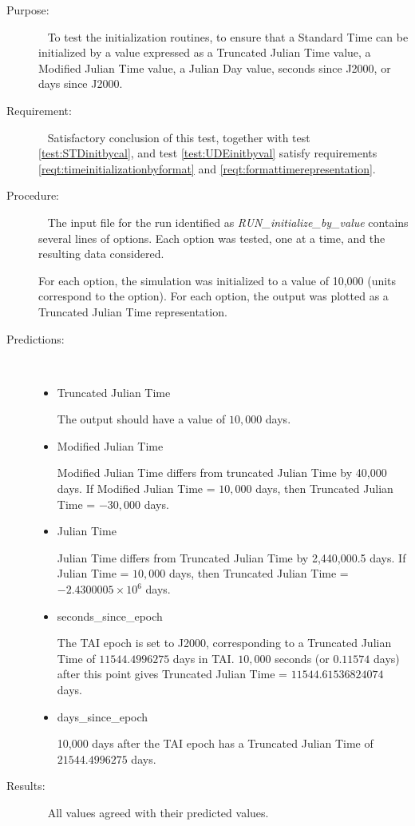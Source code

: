 \label{test:STDinitbyval}
\begin{description}
\item[Purpose:]\ \newline
To test the initialization routines, to ensure that a Standard Time can be initialized by a value expressed as a Truncated Julian Time value, a Modified Julian Time value, a Julian Day value, seconds since J2000, or days since J2000.

\item[Requirement:]\ \newline
Satisfactory conclusion of this test, together with test \ref{test:STDinitbycal}, and test \ref{test:UDEinitbyval} satisfy requirements \ref{reqt:timeinitializationbyformat} and \ref{reqt:formattimerepresentation}.

\item[Procedure:]\ \newline
The input file for the run identified as \textit{RUN\_initialize\_by\_value} contains several lines of options.  Each option was tested, one at a time, and the resulting data considered.

For each option, the simulation was initialized to a value of 10,000 (units correspond to the option).  For each option, the output was plotted as a Truncated Julian Time representation.

\item[Predictions:]\ \newline
\begin{itemize}
	\item {Truncated Julian Time}

	The output should have a value of $10,000$ days.
	\item {Modified Julian Time}

	Modified Julian Time differs from truncated Julian Time by 40,000 days.  If Modified Julian Time = $10,000$ days, then Truncated Julian Time = $-30,000$ days.
	\item {Julian Time}

	Julian Time differs from Truncated Julian Time by 2,440,000.5 days.  If Julian Time = $10,000$ days, then Truncated Julian Time = $-2.4300005 \times 10^6 $ days.
	\item {seconds\_since\_epoch}

	The TAI epoch is set to J2000, corresponding to a Truncated Julian Time of $11544.4996275$ days in TAI.  $10,000$ seconds (or $0.11574$ days) after this point gives Truncated Julian Time = $11544.61536824074$ days.
	\item {days\_since\_epoch}

	10,000 days after the TAI epoch has a Truncated Julian Time of $21544.4996275$ days.
\end{itemize}

\item[Results:]\ \newline
  All values agreed with their predicted values.
\end{description}





